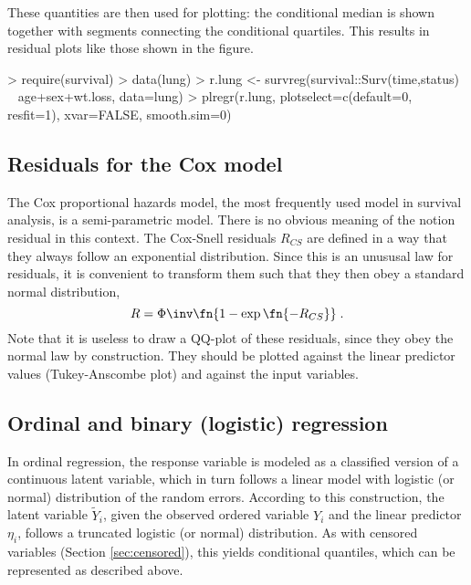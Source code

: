 \documentclass[11pt]{article}
\begin{document}
These quantities are then used for plotting: the conditional median is 
shown together with segments connecting the conditional quartiles.
This results in residual plots like those shown in the figure.

\begin{Schunk}
\begin{Sinput}
> require(survival)
> data(lung)
> r.lung <- survreg(survival::Surv(time,status) ~ age+sex+wt.loss, data=lung)
> plregr(r.lung, plotselect=c(default=0, resfit=1), xvar=FALSE, smooth.sim=0)
\end{Sinput}
\end{Schunk}

\subsection{Residuals for the Cox model}

The Cox proportional hazards model, the most frequently used model in
survival analysis, is a semi-parametric model. There is no obvious meaning
of the notion residual in this context. 
The Cox-Snell residuals $R_{CS}$ are defined in a way that they always
follow an exponential distribution. 
Since this is an unususal law for residuals, it is convenient to transform
them such that they then obey a standard normal distribution,
\[
  R = \Phi\inv\fn{1-\exp\fn{-R_{CS}}}
\;.\]
Note that it is useless to draw a QQ-plot of these residuals, since they
obey the normal law by construction. 
They should be plotted against the linear predictor values 
(Tukey-Anscombe plot) and against the input variables.



\subsection{Ordinal and binary (logistic) regression}

In ordinal regression, the response variable is modeled as a classified
version of a continuous latent variable, which in turn follows a linear
model with logistic (or normal) distribution of the random errors.
According to this construction, the latent variable $\widetilde Y_i$, given the
observed ordered variable $Y_i$ and the linear predictor $\eta_i$, 
follows a truncated logistic (or normal) distribution. 
As with censored variables (Section \ref{sec:censored}), this yields 
conditional quantiles, which can be represented as described above.
\end{document}

